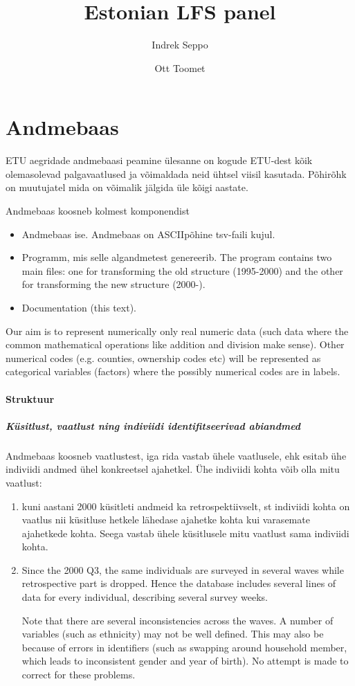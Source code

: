 \documentclass[a4paper]{article}
\title{Estonian LFS panel}
\author{Indrek Seppo \and Ott Toomet}
\begin{document}
\maketitle

\section{Andmebaas}
ETU aegridade andmebaasi peamine ülesanne on kogude ETU-dest kõik
olemasolevad palgavaatlused ja võimaldada neid ühtsel viisil kasutada.
Põhirõhk on muutujatel mida on võimalik jälgida üle kõigi aastate.

Andmebaas koosneb kolmest komponendist
\begin{itemize}
\item Andmebaas ise.  Andmebaas on ASCIIpõhine tsv-faili kujul.
\item Programm, mis selle algandmetest genereerib.  
    The program contains two main files: one
  for transforming the old structure (1995-2000) and the other for
  transforming the new structure (2000-).
\item Documentation (this text).
\end{itemize}

Our aim is to represent numerically only real numeric data (such data
where the common mathematical operations like addition and division
make sense).  Other numerical codes (e.g. counties, ownership codes
etc) will be represented as categorical variables (factors) where the
possibly numerical codes are in labels.  


\paragraph{Struktuur}

\subparagraph{Küsitlust, vaatlust ning indiviidi identifitseerivad
  abiandmed}
Andmebaas koosneb vaatlustest, iga rida vastab ühele vaatlusele, ehk
esitab ühe indiviidi andmed ühel konkreetsel ajahetkel. Ühe indiviidi
kohta võib olla mitu vaatlust: 
\begin{enumerate}
\item kuni aastani 2000 küsitleti andmeid ka retrospektiivselt, st indiviidi
  kohta on vaatlus nii küsitluse hetkele lähedase ajahetke kohta kui varasemate
  ajahetkede kohta. Seega vastab ühele küsitlusele mitu vaatlust sama indiviidi
  kohta.
\item Since the 2000 Q3, the same individuals are surveyed in several
  waves while retrospective part is dropped.  Hence the database
  includes several lines of data for every individual, describing
  several survey weeks.

  Note that there are several inconsistencies across the waves.  A
  number of variables (such as ethnicity) may not be well defined.
  This may also be because of errors in identifiers (such as swapping
  around household member, which leads to inconsistent gender and year of
  birth).  No attempt is made to correct for these problems.
\end{enumerate}
\end{document}
